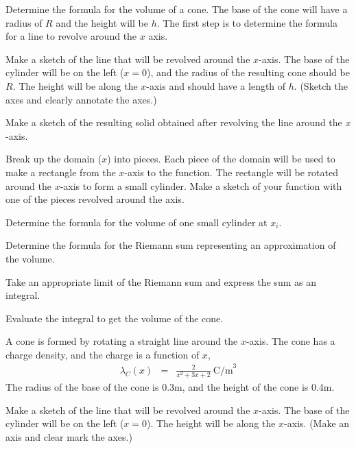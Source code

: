 \begin{problem}
\item Determine the formula for the volume of a cone.
    The base of the cone will have a radius of $R$ and the height will be $h$.
    The first step is to determine the formula for a line to revolve around the $x$ axis.
  \begin{subproblem}
    \item
      Make a sketch of the line that will be revolved around the $x$-axis.
      The base of the cylinder will be on the left ($x=0$), and the radius of the resulting cone should be $R$.
      The height will be along the $x$-axis and should have a length of $h$.
      (Sketch the axes and clearly annotate the axes.)
      \vfill

    \item Make a sketch of the resulting solid obtained after
      revolving the line around the $x$-axis.
      \vfill

    \item Break up the domain ($x$) into pieces. Each piece of the domain will be used to make a rectangle
         from the $x$-axis to the function. The rectangle will be rotated around the $x$-axis to form a small cylinder.
         Make a sketch of your function with one of the pieces revolved around the axis.
      \vfill

    \clearpage

    \item Determine the formula for the volume of one small cylinder at $x_i$.
      \vfill

    \item Determine the formula for the Riemann sum representing an approximation of the volume.
      \vfill

    \item Take an appropriate limit of the Riemann sum and express the sum as an integral.
      \vfill

    \item Evaluate the integral to get the volume of the cone.
      \vfill

  \end{subproblem}

  \clearpage

  \item A cone is formed by rotating a straight line around the $x$-axis.
     The cone has a charge density, and the charge is a function of $x$,
     \begin{eqnarray*}
       \lambda_C(x) & = & \frac{2}{x^2+3x+2} ~ \mathrm{C/m}^3
     \end{eqnarray*}
     The radius of the base of the cone is 0.3m, and the height of the cone is 0.4m.
     \begin{subproblem}
       \item
         Make a sketch of the line that will be revolved around the $x$-axis.
         The base of the cylinder will be on the left ($x=0$).
         The height will be along the $x$-axis.
         (Make an axis and clear mark the axes.)
         \vfill


\end{subproblem}
\end{problem}
